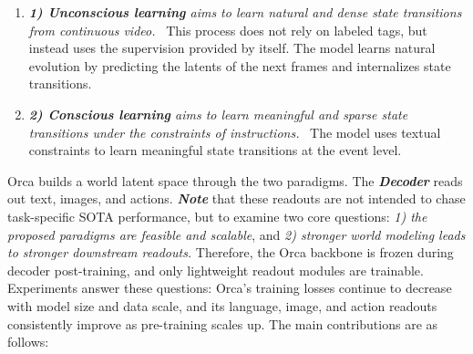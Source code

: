 \documentclass{llmxive}
\begin{document}
\vspace{-1ex}
\begin{enumerate}[label={}, leftmargin=10pt, itemindent=0pt, itemsep=0.3em, topsep=0.3em]
    \item[] \textit{\textbf{1) Unconscious learning} aims to learn natural and dense state transitions from continuous video.} \ This process does not rely on labeled tags, but instead uses the supervision provided by itself. The model learns natural evolution by predicting the latents of the next frames and internalizes state transitions. 
    \item[] \textit{\textbf{2) Conscious learning} aims to learn meaningful and sparse state transitions under the constraints of instructions.} \ The model uses textual constraints to learn meaningful state transitions at the event level.
\end{enumerate}

Orca builds a world latent space through the two paradigms. The \textbf{\textit{Decoder}} reads out text, images, and actions. \textbf{\textit{Note}} that these readouts are not intended to chase task-specific SOTA performance, but to examine two core questions: \textit{1) the proposed paradigms are feasible and scalable}, and \textit{2) stronger world modeling leads to stronger downstream readouts.} Therefore, the Orca backbone is frozen during decoder post-training, and only lightweight readout modules are trainable. Experiments answer these questions: Orca's training losses continue to decrease with model size and data scale, and its language, image, and action readouts consistently improve as pre-training scales up. The main contributions are as follows:
\end{document}
